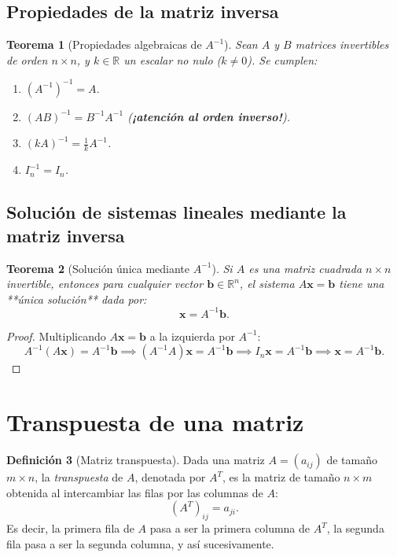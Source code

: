 \documentclass[11pt,letterpaper]{article}
\theoremstyle{definition}
\newtheorem{definicion}{Definición}[section]
\theoremstyle{plain}
\newtheorem{teorema}[definicion]{Teorema}
\newcommand{\R}{\mathbb{R}}
\newcommand{\vv}[1]{\mathbf{#1}}
\begin{document}
\subsection{Propiedades de la matriz inversa}

\begin{teorema}[Propiedades algebraicas de $A^{-1}$]
Sean $A$ y $B$ matrices invertibles de orden $n\times n$, y $k \in \R$ un escalar no nulo ($k \neq 0$). Se cumplen:
\begin{enumerate}[label=(\roman*)]
  \item $(A^{-1})^{-1} = A$.
  \item $(AB)^{-1} = B^{-1} A^{-1}$ \quad (\textbf{¡atención al orden inverso!}).
  \item $(k A)^{-1} = \frac{1}{k} A^{-1}$.
  \item $I_n^{-1} = I_n$.
\end{enumerate}
\end{teorema}

\subsection{Solución de sistemas lineales mediante la matriz inversa}

\begin{teorema}[Solución única mediante $A^{-1}$]
Si $A$ es una matriz cuadrada $n\times n$ invertible, entonces para cualquier vector $\vv{b} \in \R^n$,
el sistema $A\vv{x}=\vv{b}$ tiene una **única solución** dada por:
\[
\vv{x} = A^{-1}\vv{b}.
\]
\end{teorema}

\begin{proof}
Multiplicando $A\vv{x}=\vv{b}$ a la izquierda por $A^{-1}$:
\[
A^{-1}(A\vv{x}) = A^{-1}\vv{b} \implies (A^{-1}A)\vv{x} = A^{-1}\vv{b} \implies I_n \vv{x} = A^{-1}\vv{b} \implies \vv{x} = A^{-1}\vv{b}.
\]
\end{proof}

\section{Transpuesta de una matriz}

\begin{definicion}[Matriz transpuesta]
Dada una matriz $A = (a_{ij})$ de tamaño $m\times n$, la \emph{transpuesta} de $A$, denotada por $A^T$,
es la matriz de tamaño $n\times m$ obtenida al intercambiar las filas por las columnas de $A$:
\[
(A^T)_{ij} = a_{ji}.
\]
Es decir, la primera fila de $A$ pasa a ser la primera columna de $A^T$, la segunda fila pasa a ser la
segunda columna, y así sucesivamente.
\end{definicion}
\end{document}
